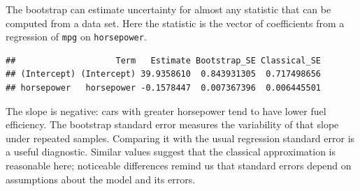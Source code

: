 \documentclass[
  11pt,
]{article}
\newenvironment{Shaded}{\begin{snugshade}}{\end{snugshade}}
\newcommand{\AttributeTok}[1]{\textcolor[rgb]{0.13,0.29,0.53}{#1}}
\newcommand{\ControlFlowTok}[1]{\textcolor[rgb]{0.13,0.29,0.53}{\textbf{#1}}}
\newcommand{\DecValTok}[1]{\textcolor[rgb]{0.00,0.00,0.81}{#1}}
\newcommand{\FunctionTok}[1]{\textcolor[rgb]{0.13,0.29,0.53}{\textbf{#1}}}
\newcommand{\NormalTok}[1]{#1}
\newcommand{\OtherTok}[1]{\textcolor[rgb]{0.56,0.35,0.01}{#1}}
\newcommand{\SpecialCharTok}[1]{\textcolor[rgb]{0.81,0.36,0.00}{\textbf{#1}}}
\newcommand{\StringTok}[1]{\textcolor[rgb]{0.31,0.60,0.02}{#1}}
\begin{document}
The bootstrap can estimate uncertainty for almost any statistic that can
be computed from a data set. Here the statistic is the vector of
coefficients from a regression of \texttt{mpg} on \texttt{horsepower}.

\begin{Shaded}
\end{Shaded}

\begin{verbatim}
##                    Term   Estimate Bootstrap_SE Classical_SE
## (Intercept) (Intercept) 39.9358610  0.843931305  0.717498656
## horsepower   horsepower -0.1578447  0.007367396  0.006445501
\end{verbatim}

The slope is negative: cars with greater horsepower tend to have lower
fuel efficiency. The bootstrap standard error measures the variability
of that slope under repeated samples. Comparing it with the usual
regression standard error is a useful diagnostic. Similar values suggest
that the classical approximation is reasonable here; noticeable
differences remind us that standard errors depend on assumptions about
the model and its errors.
\end{document}
